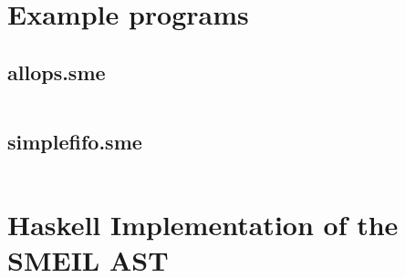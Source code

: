 \documentclass{article}
\begin{document}
\section{Example programs}

\subsection{allops.sme}
\inputminted[fontsize=\small]{c}{samples/allops3.sme}

\subsection{simplefifo.sme}
\inputminted[fontsize=\small]{c}{samples/simplefifo.sme}

\newpage
\appendix
\section{Haskell Implementation of the SMEIL AST}
\label{hsast}
\inputminted[fontsize=\small]{haskell}{../../src/Language/SMEIL/Syntax.hs}
\end{document}
